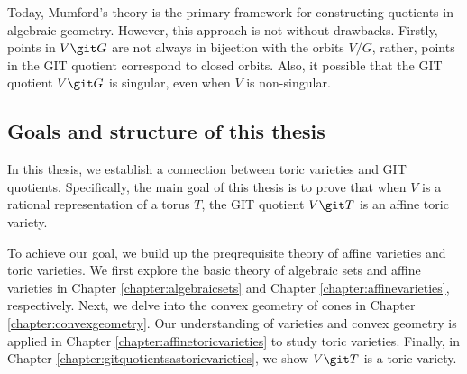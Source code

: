 \documentclass[12pt]{amsart}
\theoremstyle{plain}
\begin{document}
Today, Mumford's theory is the primary framework for constructing quotients in algebraic geometry.
However, this approach is not without drawbacks.
Firstly, points in $V \git G$ are not always in bijection with the orbits $V / G$, rather, points in the GIT quotient correspond to closed orbits.
Also, it possible that the GIT quotient $V \git G$ is singular, even when $V$ is non-singular.


\newpage
\subsection*{Goals and structure of this thesis}
In this thesis, we establish a connection between toric varieties and GIT quotients.
Specifically, the main goal of this thesis is to prove that when $V$ is a rational representation of a torus $T$, the GIT quotient $V \git T$ is an affine toric variety.

To achieve our goal, we build up the preqrequisite theory of affine varieties and toric varieties.
We first explore the basic theory of algebraic sets and affine varieties in Chapter \ref{chapter:algebraicsets} and Chapter \ref{chapter:affinevarieties}, respectively.
Next, we delve into the convex geometry of cones in Chapter \ref{chapter:convexgeometry}.
Our understanding of varieties and convex geometry is applied in Chapter \ref{chapter:affinetoricvarieties} to study toric varieties.
Finally, in Chapter \ref{chapter:gitquotientsastoricvarieties}, we show $V \git T$ is a toric variety.
\end{document}
